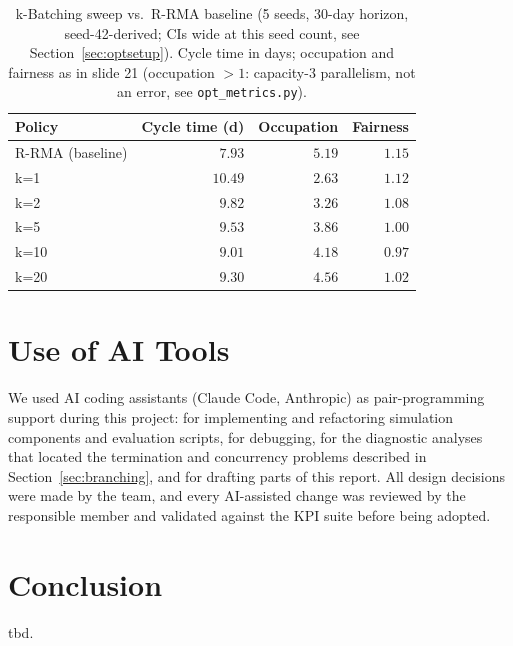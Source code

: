 \documentclass[
  english,        %
  font=times,     %
  twocolumn,      %
]{tumarticle}
\begin{document}
\begin{table}[h]
    \caption{k-Batching sweep vs.\ R-RMA baseline (5 seeds, 30-day
    horizon, seed-42-derived; CIs wide at this seed count, see
    Section~\ref{sec:optsetup}). Cycle time in days; occupation and
    fairness as in slide 21 (occupation $>\!1$: capacity-3 parallelism,
    not an error, see \texttt{opt\_metrics.py}).}
    \centering
    \renewcommand{\arraystretch}{1.2}
    \setlength{\tabcolsep}{4pt}
    \small
    \begin{tabular}{lrrr}
        \toprule
        \textbf{Policy} & \textbf{Cycle time (d)} & \textbf{Occupation} & \textbf{Fairness} \\
        \midrule
        R-RMA (baseline) & $7.93$          & $5.19$ & $1.15$ \\
        k=1              & $10.49$         & $2.63$ & $1.12$ \\
        k=2              & $9.82$          & $3.26$ & $1.08$ \\
        k=5              & $9.53$          & $3.86$ & $1.00$ \\
        k=10             & $\mathbf{9.01}$ & $4.18$ & $0.97$ \\
        k=20             & $9.30$          & $4.56$ & $1.02$ \\
        \bottomrule
    \end{tabular}
    \label{tab:kbatch}
\end{table}

\section{Use of AI Tools}
We used AI coding assistants (Claude Code, Anthropic) as pair-programming
support during this project: for implementing and refactoring simulation
components and evaluation scripts, for debugging, for the diagnostic
analyses that located the termination and concurrency problems described in
Section~\ref{sec:branching}, and for drafting parts of this report. All
design decisions were made by the team, and every AI-assisted change was
reviewed by the responsible member and validated against the KPI suite
before being adopted.

\section{Conclusion}
tbd.

%


\end{document}
